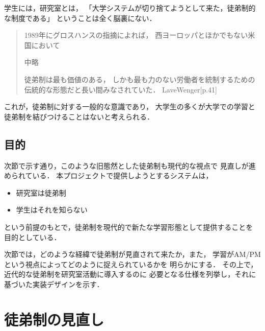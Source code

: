 \documentclass{hissymp}
\begin{document}
学生には，研究室とは，
「大学システムが切り捨てようとして来た，徒弟制的な制度である」
ということは全く脳裏にない．
\begin{quote}
1989年にグロスハンスの指摘によれば，
西ヨーロッパとほかでもない米国において

中略

徒弟制は最も価値のある，
しかも最も力のない労働者を統制するための伝統的な形態だと長い間みなされていた．
LaveWenger[p.41]
\end{quote}
これが，徒弟制に対する一般的な意識であり，
大学生の多くが大学での学習と徒弟制を結びつけることはないと考えられる．

\subsection{目的}
\label{sec:org466f095}
次節で示す通り，このような旧態然とした徒弟制も現代的な視点で
見直しが進められている．
本プロジェクトで提供しようとするシステムは，
\begin{itemize}
\item 研究室は徒弟制
\item 学生はそれを知らない
\end{itemize}
という前提のもとで，徒弟制を現代的で新たな学習形態として提供することを
目的としている．

次節では，どのような経緯で徒弟制が見直されて来たか，また，
学習がAM/PMという視点によってどのように捉えられているかを
明らかにする．
その上で，近代的な徒弟制を研究室活動に導入するのに
必要となる仕様を列挙し，それに基づいた実装デザインを示す．

\section{徒弟制の見直し}
\label{sec:org6f1a678}
\end{document}
